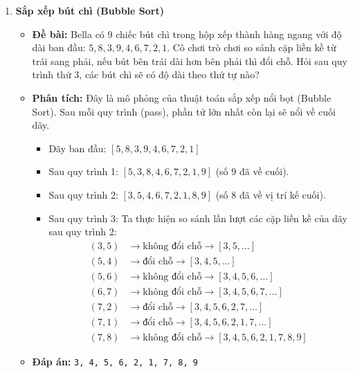 \documentclass[11pt,a4paper]{article}
\begin{document}
\begin{enumerate}[label=\textbf{Câu \arabic*:}, leftmargin=*]

\item \textbf{Sắp xếp bút chì (Bubble Sort)}
    \begin{itemize}
        \item \textbf{Đề bài:} Bella có 9 chiếc bút chì trong hộp xếp thành hàng ngang với độ dài ban đầu: $5, 8, 3, 9, 4, 6, 7, 2, 1$. Cô chơi trò chơi so sánh cặp liền kề từ trái sang phải, nếu bút bên trái dài hơn bên phải thì đổi chỗ. Hỏi sau quy trình thứ 3, các bút chì sẽ có độ dài theo thứ tự nào?
        \item \textbf{Phân tích:}
            Đây là mô phỏng của thuật toán sắp xếp nổi bọt (Bubble Sort). Sau mỗi quy trình (pass), phần tử lớn nhất còn lại sẽ nổi về cuối dãy.
            \begin{itemize}
                \item Dãy ban đầu: $[5, 8, 3, 9, 4, 6, 7, 2, 1]$
                \item Sau quy trình 1: $[5, 3, 8, 4, 6, 7, 2, 1, 9]$ (số $9$ đã về cuối).
                \item Sau quy trình 2: $[3, 5, 4, 6, 7, 2, 1, 8, 9]$ (số $8$ đã về vị trí kế cuối).
                \item Sau quy trình 3:
                    Ta thực hiện so sánh lần lượt các cặp liền kề của dãy sau quy trình 2:
                    \begin{align*}
                        (3, 5) &\to \text{không đổi chỗ} \to [3, 5, \dots] \\
                        (5, 4) &\to \text{đổi chỗ} \to [3, 4, 5, \dots] \\
                        (5, 6) &\to \text{không đổi chỗ} \to [3, 4, 5, 6, \dots] \\
                        (6, 7) &\to \text{không đổi chỗ} \to [3, 4, 5, 6, 7, \dots] \\
                        (7, 2) &\to \text{đổi chỗ} \to [3, 4, 5, 6, 2, 7, \dots] \\
                        (7, 1) &\to \text{đổi chỗ} \to [3, 4, 5, 6, 2, 1, 7, \dots] \\
                        (7, 8) &\to \text{không đổi chỗ} \to [3, 4, 5, 6, 2, 1, 7, 8, 9] 
                    \end{align*}
            \end{itemize}
        \item \textbf{Đáp án:} \texttt{3, 4, 5, 6, 2, 1, 7, 8, 9}
    \end{itemize}


\end{enumerate}
\end{document}
